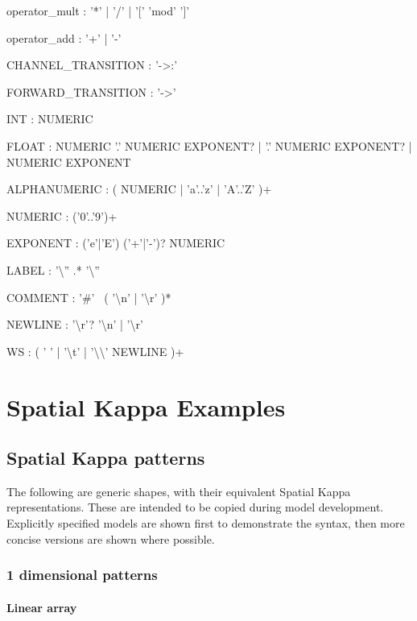 \documentclass[english]{report}
\newcommand{\newbnf}[1]{\colorbox[rgb]{0.8,0.8,1}{#1}}
\begin{document}
\begin{bnfsource}
operator_mult :
  '*' | '/' | '[' 'mod' ']'

operator_add :
  '+' | '-'

\newbnf{CHANNEL_TRANSITION :}
  \newbnf{'->:'}

FORWARD_TRANSITION :
  '->'

INT :
  NUMERIC

FLOAT :
  NUMERIC '.' NUMERIC EXPONENT?
  | '.' NUMERIC EXPONENT?
  | NUMERIC EXPONENT

ALPHANUMERIC :
  ( NUMERIC | 'a'..'z' | 'A'..'Z' )+

NUMERIC :
  ('0'..'9')+
  
EXPONENT :
  ('e'|'E') ('+'|'-')? NUMERIC

LABEL :
  '{\textbackslash}'' .* '{\textbackslash}''

COMMENT :
  '#' ~( '{\textbackslash}n' | '{\textbackslash}r' )*

NEWLINE :
  '{\textbackslash}r'? '{\textbackslash}n' | '{\textbackslash}r'

WS :
  ( ' ' | '{\textbackslash}t' | '{\textbackslash}{\textbackslash}' NEWLINE )+
\end{bnfsource}


%

\chapter{Spatial Kappa Examples}
\label{chap:resources}

\section{Spatial Kappa patterns}
\label{sec:spatialPatterns}

The following are generic shapes, with their equivalent Spatial Kappa representations. These are intended to be copied during model development. Explicitly specified models are shown first to demonstrate the syntax, then more concise versions are shown where possible.


\subsection{1 dimensional patterns}

\subsubsection{Linear array}

\begin{kappasource}
\end{kappasource}
\end{document}
